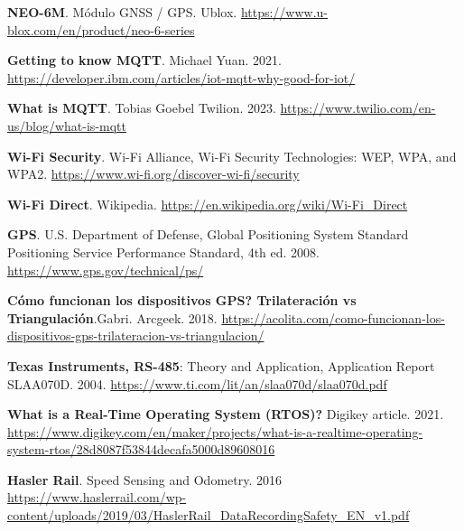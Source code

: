 \begin{thebibliography}{30}
\textbf{NEO-6M}. Módulo GNSS / GPS. Ublox. \href{https://www.u-blox.com/en/product/neo-6-series}{https://www.u-blox.com/en/product/neo-6-series}


\textbf{Getting to know MQTT}. Michael Yuan. 2021. \href{https://developer.ibm.com/articles/iot-mqtt-why-good-for-iot/}{https://developer.ibm.com/articles/iot-mqtt-why-good-for-iot/}

\textbf{What is MQTT}. Tobias Goebel
Twilion. 2023. \href{https://www.twilio.com/en-us/blog/what-is-mqtt}{https://www.twilio.com/en-us/blog/what-is-mqtt}


\textbf{Wi-Fi Security}. Wi-Fi Alliance, Wi-Fi Security Technologies: WEP, WPA, and WPA2. \href{https://www.wi-fi.org/discover-wi-fi/security}{https://www.wi-fi.org/discover-wi-fi/security}

\textbf{Wi-Fi Direct}. Wikipedia. \href{https://en.wikipedia.org/wiki/Wi-Fi_Direct}{https://en.wikipedia.org/wiki/Wi-Fi\_Direct}


\textbf{GPS}. U.S. Department of Defense, Global Positioning System Standard Positioning Service Performance Standard, 4th ed. 2008. \href{https://www.gps.gov/technical/ps/}{https://www.gps.gov/technical/ps/}

\textbf{Cómo funcionan los dispositivos GPS? Trilateración vs Triangulación}.Gabri. Arcgeek. 2018.  \href{https://acolita.com/como-funcionan-los-dispositivos-gps-trilateracion-vs-triangulacion/}{https://acolita.com/como-funcionan-los-dispositivos-gps-trilateracion-vs-triangulacion/}



\textbf{Texas Instruments, RS-485}: Theory and Application, Application Report SLAA070D. 2004. \href{https://www.ti.com/lit/an/slaa070d/slaa070d.pdf}{https://www.ti.com/lit/an/slaa070d/slaa070d.pdf}

\textbf{What is a Real-Time Operating System (RTOS)?} Digikey article. 2021. \href{https://www.digikey.com/en/maker/projects/what-is-a-realtime-operating-system-rtos/28d8087f53844decafa5000d89608016}{https://www.digikey.com/en/maker/projects/what-is-a-realtime-operating-system-rtos/28d8087f53844decafa5000d89608016}



\textbf{Hasler Rail}. Speed Sensing and Odometry. 2016
\href{https://www.haslerrail.com/wp-content/uploads/2019/03/HaslerRail_DataRecordingSafety_EN_v1.pdf}{https://www.haslerrail.com/wp-content/uploads/2019/03/HaslerRail\_DataRecordingSafety\_EN\_v1.pdf}


\end{thebibliography}

